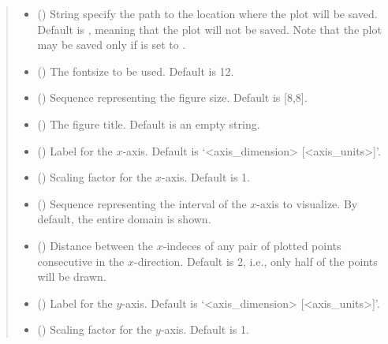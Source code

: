 \documentclass[letterpaper,10pt,english]{sphinxmanual}
\begin{document}
\begin{fulllineitems}
\begin{quote}
\begin{description}
\begin{itemize}
\item {} 
 () \textendash{} String specify the path to the location where the plot will be saved. Default is , meaning that the plot
will not be saved. Note that the plot may be saved only if  is set to .

\item {} 
 () \textendash{} The fontsize to be used. Default is 12.

\item {} 
 () \textendash{} Sequence representing the figure size. Default is {[}8,8{]}.

\item {} 
 () \textendash{} The figure title. Default is an empty string.

\item {} 
 () \textendash{} Label for the \(x\)-axis. Default is ‘\textless{}axis\_dimension\textgreater{} {[}\textless{}axis\_units\textgreater{}{]}’.

\item {} 
 () \textendash{} Scaling factor for the \(x\)-axis. Default is 1.

\item {} 
 () \textendash{} Sequence representing the interval of the \(x\)-axis to visualize. By default, the entire domain is shown.

\item {} 
 () \textendash{} Distance between the \(x\)-indeces of any pair of plotted points consecutive in the \(x\)-direction.
Default is 2, i.e., only half of the points will be drawn.

\item {} 
 () \textendash{} Label for the \(y\)-axis. Default is ‘\textless{}axis\_dimension\textgreater{} {[}\textless{}axis\_units\textgreater{}{]}’.

\item {} 
 () \textendash{} Scaling factor for the \(y\)-axis. Default is 1.


\end{itemize}
\end{description}
\end{quote}
\end{fulllineitems}
\end{document}

